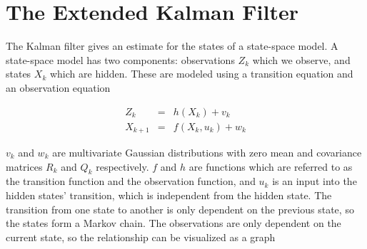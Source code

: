 \section{The Extended Kalman Filter}
\label{EKF}

The Kalman filter gives an estimate for the states of a state-space model. A state-space model has two components: observations $Z_k$ which we observe, and states $X_k$ which are hidden. These are modeled using a transition equation and an observation equation

$$
\begin{array}{lcl}
Z_k &=& h(X_k) + v_k
\\
X_{k+1} &=& f(X_k, u_k) + w_k
\end{array}
$$

 $v_k$ and $w_k$ are multivariate Gaussian distributions with zero mean and covariance matrices $R_k$ and $Q_k$ respectively. $f$ and $h$ are functions which are referred to as the transition function and the observation function, and $u_k$ is an input into the hidden states' transition, which is independent from the hidden state. The transition from one state to another is only dependent on the previous state, so the states form a Markov chain. The observations are only dependent on the current state, so the relationship can be visualized as a graph

 \


